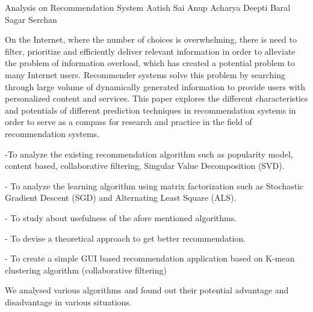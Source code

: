  \begin{conf-abstract}[]
 {Analysis on Recommendation System }
 { Aatish Sai
 	Anup Acharya
 	Deepti Baral
 	Sagar Serchan
 }
{}

On the Internet, where the number of choices is overwhelming, there is need to filter, prioritize and efficiently deliver relevant information in order to alleviate the problem of information overload, which has created a potential problem to many Internet users. Recommender systems solve this problem by searching through large volume of dynamically generated information to provide users with personalized content and services. This paper explores the different characteristics and potentials of different prediction techniques in recommendation systems in order to serve as a compass for research and practice in the field of recommendation systems.

-To analyze the existing recommendation algorithm such as
popularity model, content based, collaborative filtering, Singular
Value Decomposition (SVD).

- To analyze the learning algorithm using matrix factorization such as
Stochastic Gradient Descent (SGD) and Alternating Least Square
(ALS).

- To study about usefulness of the afore mentioned algorithms.

- To devise a theoretical approach to get better recommendation.

- To create a simple GUI based recommendation application based on
K-mean clustering algorithm (collaborative filtering)

We analysed various algorithms and found out their potential advantage and disadvantage in various situations.
 
\end{conf-abstract}